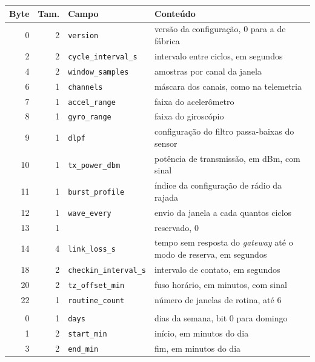\begin{quadro}[!htbp]
\centering\small
\caption{Bloco de configuração da resposta, de 23 bytes e mais 5 por janela de rotina}\label{tab:ap-config}
\begin{tabular}{@{}rr>{\raggedright\arraybackslash}p{38mm}>{\raggedright\arraybackslash}p{78mm}@{}}
\toprule
Byte & Tam. & Campo & Conteúdo \\
\midrule
0 & 2 & \texttt{version} & versão da configuração, 0 para a de fábrica \\
2 & 2 & \texttt{cycle\_interval\_s} & intervalo entre ciclos, em segundos \\
4 & 2 & \texttt{window\_samples} & amostras por canal da janela \\
6 & 1 & \texttt{channels} & máscara dos canais, como na telemetria \\
7 & 1 & \texttt{accel\_range} & faixa do acelerômetro \\
8 & 1 & \texttt{gyro\_range} & faixa do giroscópio \\
9 & 1 & \texttt{dlpf} & configuração do filtro passa-baixas do sensor \\
10 & 1 & \texttt{tx\_power\_dbm} & potência de transmissão, em dBm, com sinal \\
11 & 1 & \texttt{burst\_profile} & índice da configuração de rádio da rajada \\
12 & 1 & \texttt{wave\_every} & envio da janela a cada quantos ciclos \\
13 & 1 & & reservado, 0 \\
14 & 4 & \texttt{link\_loss\_s} & tempo sem resposta do \textit{gateway} até o modo de reserva, em segundos \\
18 & 2 & \texttt{checkin\_interval\_s} & intervalo de contato, em segundos \\
20 & 2 & \texttt{tz\_offset\_min} & fuso horário, em minutos, com sinal \\
22 & 1 & \texttt{routine\_count} & número de janelas de rotina, até 6 \\
\addlinespace
\multicolumn{4}{@{}l}{Cada janela de rotina, a partir do byte $23 + 5i$:} \\
0 & 1 & \texttt{days} & dias da semana, bit 0 para domingo \\
1 & 2 & \texttt{start\_min} & início, em minutos do dia \\
3 & 2 & \texttt{end\_min} & fim, em minutos do dia \\
\bottomrule
\end{tabular}
\end{quadro}

